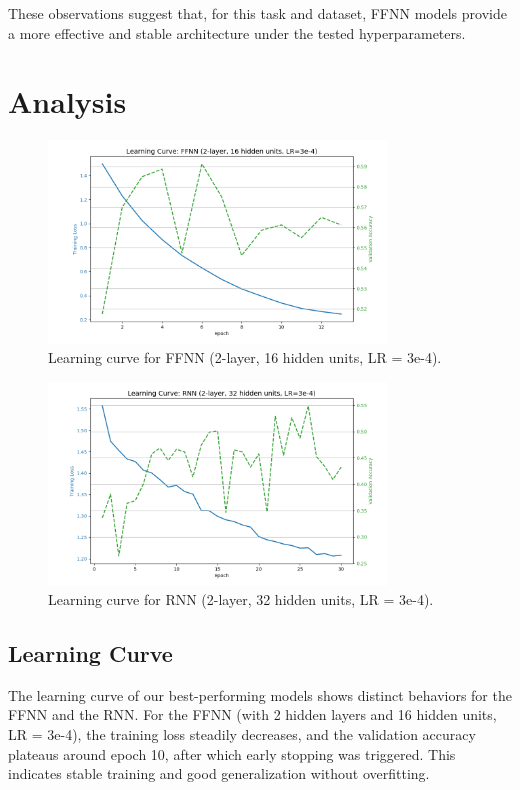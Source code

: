 \documentclass[a4paper]{article}
\begin{document}
These observations suggest that, for this task and dataset, FFNN models provide a more effective and stable architecture under the tested hyperparameters.


\section{Analysis}

\begin{figure}[H]
    \centering
    \includegraphics[width=0.8\textwidth]{figs/best-ffnn-plot.png}
    \caption{Learning curve for FFNN (2-layer, 16 hidden units, LR = 3e-4).}
    \label{fig:ffnn-curve}
\end{figure}

\begin{figure}[H]
    \centering
    \includegraphics[width=0.8\textwidth]{figs/best-rnn-plot.png}
    \caption{Learning curve for RNN (2-layer, 32 hidden units, LR = 3e-4).}
    \label{fig:rnn-curve}
\end{figure}


\subsection*{Learning Curve}
The learning curve of our best-performing models shows distinct behaviors for the FFNN and the RNN. For the FFNN (with 2 hidden layers and 16 hidden units, LR = 3e-4), the training loss steadily decreases, and the validation accuracy plateaus around epoch 10, after which early stopping was triggered. This indicates stable training and good generalization without overfitting.
\end{document}
